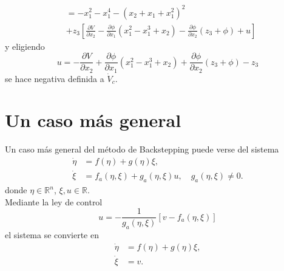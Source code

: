 {\begin{equation*}
\begin{aligned}
			&= -x_1^2 - x_1^4 - (x_2 + x_1 + x_1^2)^2\\
			&+ z_3\left[ \frac{\partial V}{\partial x_2} - \frac{\partial \phi}{\partial x_1} (x_1^2 - x_1^3 + x_2) - \frac{\partial \phi}{\partial x_2} (z_3 + \phi) + u  \right]
		\end{aligned}
	\end{equation*}
	y eligiendo
	\begin{equation*}
		u = - \frac{\partial V}{\partial x_2} + \frac{\partial \phi}{\partial x_1} (x_1^2 - x_1^3 + x_2) + \frac{\partial \phi}{\partial x_2} (z_3 + \phi) - z_3
	\end{equation*}
	se hace negativa definida a $\dot{V}_c$.
}
\section{Un caso más general}
Un caso más general del método de Backstepping puede verse del sistema
\begin{equation}
	\begin{aligned}
		\dot{\eta} &= f(\eta) + g(\eta)\xi, \\
		\dot{\xi} &= f_a(\eta, \xi) + g_a(\eta, \xi)u, \quad g_a(\eta, \xi) \neq 0.
	\end{aligned}
	\label{eq: backstepping_general}
\end{equation}
donde $\eta \in \mathbb{R}^n$, $\xi, u \in \mathbb{R}$.\\

Mediante la ley de control
\begin{equation*}
	u = -\dfrac{1}{g_a(\eta, \xi)}\left[ v - f_a(\eta, \xi) \right]
\end{equation*}
el sistema se convierte en
\begin{equation}
	\begin{aligned}
		\dot{\eta} &= f(\eta) + g(\eta)\xi, \\
		\dot{\xi} &= v.
	\end{aligned}
	\label{eq: backstepping_general_v}
\end{equation}

